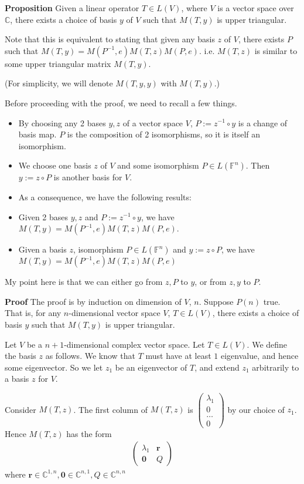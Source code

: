 \documentclass{article}
\begin{document}
\textbf{Proposition} Given a linear operator $T\in L(V)$, where $V$ is a vector space over $\mathbb{C}$, there exists a choice of basis $y$ of $V$ such that $M(T, y)$ is upper triangular.

Note that this is equivalent to stating that given any basis $z$ of $V$, there exists $P$ such that $M(T, y)=M(P^{-1},e)M(T, z)M(P, e)$. i.e. $M(T, z)$ is similar to some upper triangular matrix $M(T, y)$.


(For simplicity, we will denote $M(T, y, y)$ with $M(T, y)$.)

Before proceeding with the proof, we need to recall a few things. \begin{itemize}
	\item By choosing any 2 bases $y,z$ of a vector space $V$, $P:=z^{-1}\circ y$ is a change of basis map. $P$ is the composition of 2 isomorphisms, so it is itself an isomorphism. 
	\item We choose one basis $z$ of $V$ and some isomorphism $P\in L(\mathbb{F}^n)$. Then $y:=z\circ P$ is another basis for $V$.
	\item As a consequence, we have the following results:
	\item Given 2 bases $y,z$ and $P:=z^{-1}\circ y$, we have $M(T, y)=M(P^{-1},e)M(T, z)M(P, e)$.
	\item Given a basis $z$, isomorphism $P\in L(\mathbb{F}^n)$ and $y:=z\circ P$, we have $M(T, y)=M(P^{-1},e)M(T, z)M(P, e)$
\end{itemize}
My point here is that we can either go from $z,P$ to $y$, or from $z,y$ to $P$.


\textbf{Proof} The proof is by induction on dimension of $V$, $n$. Suppose $P(n)$ true. That is, for any $n$-dimensional vector space $V$, $T\in L(V)$, there exists a choice of basis $y$ such that $M(T,y)$ is upper triangular.

Let $V$ be a $n+1$-dimensional complex vector space. Let $T\in L(V)$. We define the basis $z$ as follows. We know that $T$ must have at least $1$ eigenvalue, and hence some eigenvector. So we let $z_1$ be an eigenvector of $T$, and extend $z_1$ arbitrarily to a basis $z$ for $V$. 

Consider $M(T,z)$. The first column of $M(T,z)$ is $\begin{pmatrix}
	\lambda_1\\
	0\\
	\dots \\
	0
\end{pmatrix}$ by our choice of $z_1$. Hence $M(T,z)$ has the form
\begin{align*}
	\begin{pmatrix}
		\lambda_1 & \mathbf{r} \\
		\mathbf{0} & Q
	\end{pmatrix}
\end{align*}
where $\mathbf{r}\in \mathbb{C}^{1,n}, \mathbf{0}\in \mathbb{C}^{n,1}, Q\in \mathbb{C}^{n,n}$
\end{document}
